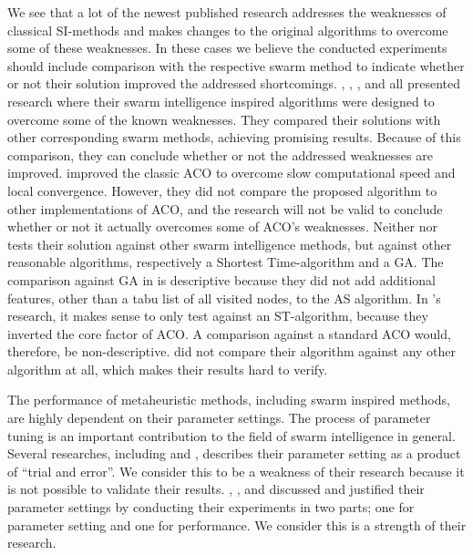 We see that a lot of the newest published research addresses the weaknesses of classical SI-methods and makes changes to the original algorithms to overcome some of these weaknesses. In these cases we believe the conducted experiments should include comparison with the respective swarm method to indicate whether or not their solution improved the addressed shortcomings. \citet{tripathi09}, \citet{yang07}, \citet{salehinejad10}, and \citet{jiang10} all presented research where their swarm intelligence inspired algorithms were designed to overcome some of the known weaknesses. They compared their solutions with other corresponding swarm methods, achieving promising results. Because of this comparison, they can conclude whether or not the addressed weaknesses are improved. \citet{sedighpour14} improved the classic ACO to overcome slow computational speed and local convergence. However, they did not compare the proposed algorithm to other implementations of ACO, and the research will not be valid to conclude whether or not it actually overcomes some of ACO's weaknesses. 
Neither \citet{dias14} nor \citet{poorzahedy11} tests their solution against other swarm intelligence methods, but against other reasonable algorithms, respectively a Shortest Time-algorithm and a GA. The comparison against GA in \citet{poorzahedy11} is descriptive because they did not add additional features, other than a tabu list of all visited nodes, to the AS algorithm. In \citet{dias14}'s research, it makes sense to only test against an ST-algorithm, because they inverted the core factor of ACO. A comparison against a standard ACO would, therefore, be non-descriptive. \citet{salehi-nezhad07} did not compare their algorithm against any other algorithm at all, which makes their results hard to verify. 

The performance of metaheuristic methods, including swarm inspired methods, are highly dependent on their parameter settings. The process of parameter tuning is an important contribution to the field of swarm intelligence in general. Several researches, including \citet{salehi-nezhad07} and \citet{yang07}, describes their parameter setting as a product of ``trial and error''. We consider this to be a weakness of their research because it is not possible to validate their results. \citet{sedighpour14}, \citet{poorzahedy11}, and \citet{kechagiopoulos14} discussed and justified their parameter settings by conducting their experiments in two parts; one for parameter setting and one for performance. We consider this is a strength of their research. 


